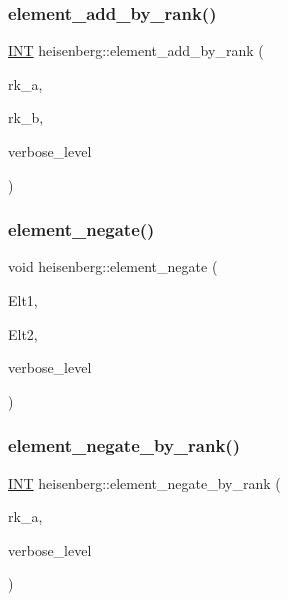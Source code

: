 \subsubsection{\texorpdfstring{element\+\_\+add\+\_\+by\+\_\+rank()}{element\_add\_by\_rank()}}
{\footnotesize\ttfamily \mbox{\hyperlink{galois_8h_a09fddde158a3a20bd2dcadb609de11dc}{I\+NT}} heisenberg\+::element\+\_\+add\+\_\+by\+\_\+rank (\begin{DoxyParamCaption}\item[{\mbox{\hyperlink{galois_8h_a09fddde158a3a20bd2dcadb609de11dc}{I\+NT}}}]{rk\+\_\+a,  }\item[{\mbox{\hyperlink{galois_8h_a09fddde158a3a20bd2dcadb609de11dc}{I\+NT}}}]{rk\+\_\+b,  }\item[{\mbox{\hyperlink{galois_8h_a09fddde158a3a20bd2dcadb609de11dc}{I\+NT}}}]{verbose\+\_\+level }\end{DoxyParamCaption})}

\mbox{\label{classheisenberg_aceccdc4c30ae78320961720b74ec24c1}} 
\subsubsection{\texorpdfstring{element\+\_\+negate()}{element\_negate()}}
{\footnotesize\ttfamily void heisenberg\+::element\+\_\+negate (\begin{DoxyParamCaption}\item[{\mbox{\hyperlink{galois_8h_a09fddde158a3a20bd2dcadb609de11dc}{I\+NT}} $\ast$}]{Elt1,  }\item[{\mbox{\hyperlink{galois_8h_a09fddde158a3a20bd2dcadb609de11dc}{I\+NT}} $\ast$}]{Elt2,  }\item[{\mbox{\hyperlink{galois_8h_a09fddde158a3a20bd2dcadb609de11dc}{I\+NT}}}]{verbose\+\_\+level }\end{DoxyParamCaption})}

\mbox{\label{classheisenberg_a1d0d7cab573376418a779a794e8a83a9}} 
\subsubsection{\texorpdfstring{element\+\_\+negate\+\_\+by\+\_\+rank()}{element\_negate\_by\_rank()}}
{\footnotesize\ttfamily \mbox{\hyperlink{galois_8h_a09fddde158a3a20bd2dcadb609de11dc}{I\+NT}} heisenberg\+::element\+\_\+negate\+\_\+by\+\_\+rank (\begin{DoxyParamCaption}\item[{\mbox{\hyperlink{galois_8h_a09fddde158a3a20bd2dcadb609de11dc}{I\+NT}}}]{rk\+\_\+a,  }\item[{\mbox{\hyperlink{galois_8h_a09fddde158a3a20bd2dcadb609de11dc}{I\+NT}}}]{verbose\+\_\+level }\end{DoxyParamCaption})}

